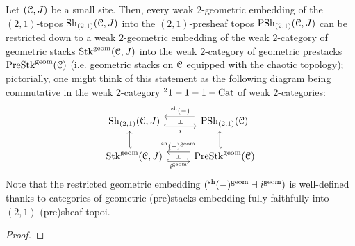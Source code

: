                     \begin{theorem} \label{theorem: (2,1)_sheafification_of_geometric_prestacks}
                        Let $(\mathcal{C}, J)$ be a small site. Then, every weak $2$-geometric embedding of the $(2, 1)$-topos $\mathrm{Sh}_{(2, 1)}(\mathcal{C}, J)$ into the $(2, 1)$-presheaf topos $\mathrm{PSh}_{(2, 1)}(\mathcal{C}, J)$ can be restricted down to a weak $2$-geometric embedding of the weak $2$-category of geometric stacks $\mathrm{Stk}^{\mathrm{geom}}(\mathcal{C}, J)$ into the weak $2$-category of geometric prestacks $\mathrm{Pre}\mathrm{Stk}^{\mathrm{geom}}(\mathcal{C})$ (i.e. geometric stacks on $\mathcal{C}$ equipped with the chaotic topology); pictorially, one might think of this statement as the following diagram being commutative in the weak $2$-category ${}^21-1-1-\mathrm{Cat}$ of weak $2$-categories: 
                            $$
                                \begin{tikzcd}
                                	{\Sh_{(2, 1)}(\C, J)} & {\Psh_{(2, 1)}(\C)} \\
                                	{\Stk^{\geom}(\C, J)} & {\Pre\Stk^{\geom}(\C)}
                                	\arrow[""{name=0, anchor=center, inner sep=0}, "{{}^{\sh}(-)}"', shift right=2, shorten <=2pt, from=1-2, to=1-1]
                                	\arrow[""{name=1, anchor=center, inner sep=0}, "i"', shift right=2, hook, from=1-1, to=1-2]
                                	\arrow[shift left=2, hook', from=2-1, to=1-1]
                                	\arrow[shift left=2, hook', from=2-2, to=1-2]
                                	\arrow[""{name=2, anchor=center, inner sep=0}, "{i^{\geom}}"', shift right=2, hook, from=2-1, to=2-2]
                                	\arrow[""{name=3, anchor=center, inner sep=0}, "{{}^{\sh}(-)^{\geom}}"', shift right=2, from=2-2, to=2-1]
                                	\arrow["\dashv"{anchor=center, rotate=-90}, draw=none, from=0, to=1]
                                	\arrow["\dashv"{anchor=center, rotate=-90}, draw=none, from=3, to=2]
                                \end{tikzcd}
                            $$
                        Note that the restricted geometric embedding $({}^{\mathrm{sh}}(-)^{\mathrm{geom}} \dashv i^{\mathrm{geom}})$ is well-defined thanks to categories of geometric (pre)stacks embedding fully faithfully into $(2, 1)$-(pre)sheaf topoi.
                    \end{theorem}
                        \begin{proof}
                            
                        \end{proof}
                
